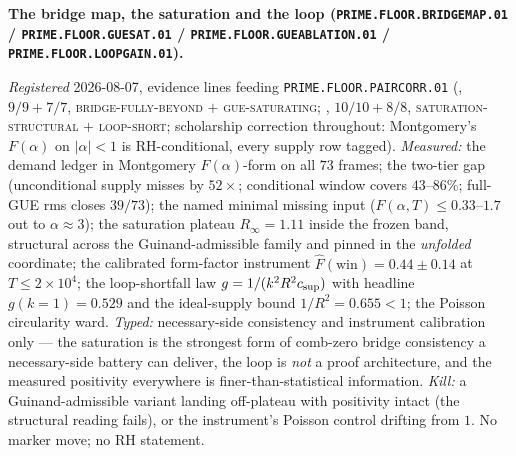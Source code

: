 \documentclass[11pt,a4paper]{article}
\begin{document}
\par\smallskip\noindent\textbf{The bridge map, the saturation and
the loop (\texttt{PRIME.FLOOR.BRIDGEMAP.01} /
\texttt{PRIME.FLOOR.GUESAT.01} /
\texttt{PRIME.FLOOR.GUEABLATION.01} /
\texttt{PRIME.FLOOR.LOOPGAIN.01}).}
{\sloppy
\emph{Registered} 2026-08-07, evidence lines feeding
\texttt{PRIME.FLOOR.PAIRCORR.01}
(, $9/9 + 7/7$,
\textsc{bridge-fully-beyond} $+$ \textsc{gue-saturating};
, $10/10 + 8/8$,
\textsc{saturation-structural} $+$ \textsc{loop-short};
scholarship correction throughout: Montgomery's $F(\alpha)$ on
$|\alpha| < 1$ is RH-conditional, every supply row tagged).
\emph{Measured:} the demand ledger in Montgomery
$F(\alpha)$-form on all $73$ frames; the two-tier gap
(unconditional supply misses by $52\times$; conditional window
covers $43$--$86\%$; full-GUE rms closes $39/73$); the named
minimal missing input ($F(\alpha, T) \le 0.33$--$1.7$ out to
$\alpha \approx 3$); the saturation plateau $R_\infty = 1.11$
inside the frozen band, structural across the Guinand-admissible
family and pinned in the \emph{unfolded} coordinate; the
calibrated form-factor instrument
$\hat F(\mathrm{win}) = 0.44 \pm 0.14$ at $T \le 2\times10^4$;
the loop-shortfall law $g = 1/(k^2 R^2 c_{\rm sup})$ with
headline $g(k{=}1) = 0.529$ and the ideal-supply bound
$1/R^2 = 0.655 < 1$; the Poisson circularity ward.
\emph{Typed:} necessary-side consistency and instrument
calibration only --- the saturation is the strongest form of
comb-zero bridge consistency a necessary-side battery can
deliver, the loop is \emph{not} a proof architecture, and the
measured positivity everywhere is finer-than-statistical
information.  \emph{Kill:} a Guinand-admissible variant landing
off-plateau with positivity intact (the structural reading
fails), or the instrument's Poisson control drifting from $1$.
No marker move; no RH statement.\par}
\end{document}
